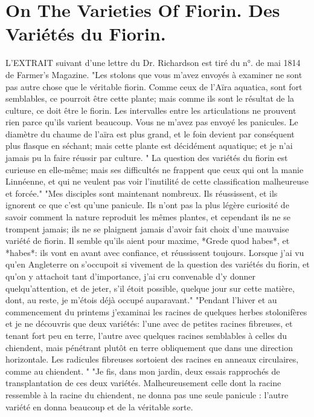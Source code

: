 \setcounter{page}{249}
\section{On The Varieties Of Fiorin. Des Variétés du Fiorin.}
L'EXTRAIT suivant d'une lettre du Dr. Richardson est tiré du n°. de mai 1814 de Farmer's Magazine.
"Les stolons que vous m'avez envoyés à examiner ne sont pas autre chose que le véritable fiorin. Comme ceux de l'Aïra aquatica, sont fort semblables, ce pourroit être cette plante; mais comme ils sont le résultat de la culture, ce doit être le fiorin. Les intervalles entre les articulations ne prouvent rien parce qu'ils varient beaucoup. Vous ne m'avez pas envoyé les panicules. Le diamètre du chaume de l'aïra est plus grand, et le foin devient par conséquent plus flasque en séchant; mais cette plante est décidément aquatique; et je n'ai jamais pu la faire réussir par culture.
" La question des variétés du fiorin est curieuse en elle-même; mais ses difficultés ne frappent que ceux qui ont la manie Linnéenne, et qui ne veulent pas voir l'inutilité de cette classification malheureuse et forcée."
\setcounter{page}{250}
"Mes disciples sont maintenant nombreux. Ils réussissent, et ils ignorent ce que c'est qu'une panicule. Ils n'ont pas la plus légère curiosité de savoir comment la nature reproduit les mêmes plantes, et cependant ils ne se trompent jamais; ils ne se plaignent jamais d'avoir fait choix d'une mauvaise variété de fiorin. Il semble qu'ils aient pour maxime, *Grede quod habes*, et *habes*: ils vont en avant avec confiance, et réussissent toujours.
Lorsque j'ai vu qu'en Angleterre on s'occupoit si vivement de la question des variétés du fiorin, et qu'on y attachoit tant d'importance, j'ai cru convenable d'y donner quelqu'attention, et de jeter, s'il étoit possible, quelque jour sur cette matière, dont, au reste, je m'étois déjà occupé auparavant."
"Pendant l'hiver et au commencement du printems j'examinai les racines de quelques herbes stolonifères et je ne découvris que deux variétés: l'une avec de petites racines fibreuses, et tenant fort peu en terre, l'autre avec quelques racines semblables à celles du chiendent, mais pénétrant plutôt en terre obliquement que dans une direction horizontale. Les radicules fibreuses sortoient des racines en anneaux circulaires, comme au chiendent. "
"Je fis, dans mon jardin, deux essais rapprochés\setcounter{page}{251} de transplantation de ces deux variétés. Malheureusement celle dont la racine ressemble à la racine du chiendent, ne donna pas une seule panicule : l'autre variété en donna beaucoup et de la véritable sorte.
